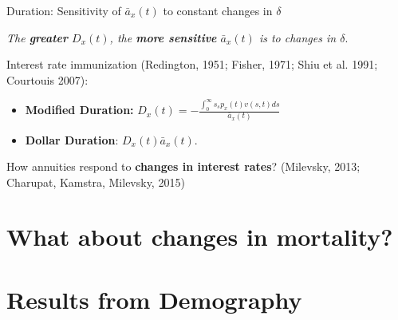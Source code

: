 \documentclass[10pt]{beamer}
\begin{document}
\begin{frame}{Duration: Sensitivity of $\bar{a}_x(t)$ to constant changes in $\delta$}


\begin{center}\nonumber
{}
\end{center} \pause





\begin{center}
\textit{The \textbf{greater} ${D}_{x}(t)$, the \textbf{more sensitive} $\bar{a}_x(t)$ is to changes in $\delta$}.\pause
\end{center}




Interest rate immunization {\scriptsize (Redington, 1951; Fisher, 1971; Shiu et al. 1991; Courtouis 2007)}: \pause

\begin{itemize}
	\item \textbf{Modified Duration:} ${D}_{x}(t) = -\frac{\int_0^\infty s {}_sp_x(t) {v}(s,t)ds}{\bar{a}_x(t)}$\pause
	

	\item \textbf{Dollar Duration}: ${D}_{x}(t)\bar{a}_x(t)$.\pause
\end{itemize}


How annuities respond to\textbf{ changes in interest rates}? {\scriptsize(Milevsky, 2013; Charupat, Kamstra, Milevsky, 2015)}


\end{frame}

\section{What about changes in mortality?}

\section{Results from Demography}
\end{document}
